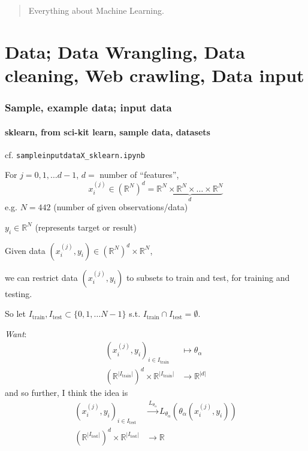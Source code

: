 \documentclass[10pt]{amsart}
\begin{document}
\begin{multicols*}{2}

\begin{abstract}
Everything about Machine Learning.  
\end{abstract}

\part{Data; Data Wrangling, Data cleaning, Web crawling, Data input}

\section{Sample, example data; input data}


\subsection{sklearn, from sci-kit learn, sample data, datasets}

cf. \verb|sampleinputdataX_sklearn.ipynb| 

For $j=0,1,\dots d-1$, $d=$ number of ``features'',
\[
x_i^{(j)} \in (\mathbb{R}^N)^d = \underbrace{ \mathbb{R}^N \times \mathbb{R}^N \times \dots \times \mathbb{R}^N  }_{ d } 
\]
e.g. $N= 442$ (number of given observations/data)

$y_i \in \mathbb{R}^N$ (represents target or result)

Given data $(x_i^{(j)}, y_i) \in (\mathbb{R}^N)^d \times \mathbb{R}^N$,

we can restrict data $(x_i^{(j)}, y_i)$ to subsets to train and test, for training and testing.

So let $I_{\text{train}}, I_{\text{test}} \subset \lbrace 0, 1 , \dots N-1 \rbrace$ s.t. $I_{\text{train}} \cap I_{\text{test}} = \emptyset$.

\emph{Want}:
\[
\begin{aligned}
  (x_i^{(j)}, y_i)_{i \in I_{\text{train}} }  & \mapsto \theta_{\alpha}   \\ 
  (\mathbb{R}^{ |I_{\text{train}} |})^d \times \mathbb{R}^{|I_{\text{train}}|} & \to \mathbb{R}^{|d|} 
  \end{aligned}
\]
and so further, I think the idea is
\[
\begin{aligned}
  (x_i^{(j)}, y_i)_{i \in I_{\text{test}} }  & \xrightarrow{L_{\theta_{\alpha}} } L_{\theta_{\alpha}}( \theta_{\alpha}(x_i^{(j)}, y_i) ) \\ 
(\mathbb{R}^{ |I_{\text{test}}|})^d \times \mathbb{R}^{ |I_{\text{test}}|} & \to \mathbb{R}
  \end{aligned}
\]


\end{multicols*}
\end{document}

